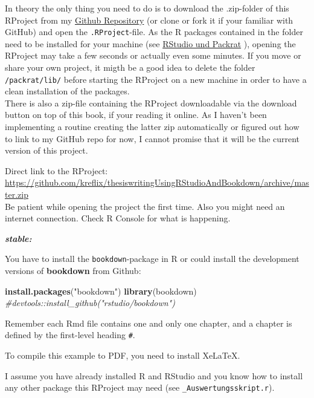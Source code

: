 \documentclass[]{book}
\makeatletter
\newenvironment{Shaded}{\begin{snugshade}}{\end{snugshade}}
\newcommand{\KeywordTok}[1]{\textcolor[rgb]{0.13,0.29,0.53}{\textbf{{#1}}}}
\newcommand{\StringTok}[1]{\textcolor[rgb]{0.31,0.60,0.02}{{#1}}}
\newcommand{\CommentTok}[1]{\textcolor[rgb]{0.56,0.35,0.01}{\textit{{#1}}}}
\newcommand{\NormalTok}[1]{{#1}}
\newenvironment{kframe}{%
\medskip{}
\setlength{\fboxsep}{.8em}
 \def\at@end@of@kframe{}%
 \ifinner\ifhmode%
  \def\at@end@of@kframe{\end{minipage}}%
  \begin{minipage}{\columnwidth}%
 \fi\fi%
 \def\FrameCommand##1{\hskip\@totalleftmargin \hskip-\fboxsep
 \colorbox{shadecolor}{##1}\hskip-\fboxsep
     \hskip-\linewidth \hskip-\@totalleftmargin \hskip\columnwidth}%
 \MakeFramed {\advance\hsize-\width
   \@totalleftmargin\z@ \linewidth\hsize
   \@setminipage}}%
 {\par\unskip\endMakeFramed%
 \at@end@of@kframe}
\renewenvironment{Shaded}{\begin{kframe}}{\end{kframe}}
\theoremstyle{definition}
\theoremstyle{definition}
\theoremstyle{remark}
\let\BeginKnitrBlock\begin \let\EndKnitrBlock\end
\makeatother
\begin{document}
In theory the only thing you need to do is to download the .zip-folder
of this RProject from my
\href{https://github.com/kreflix/thesiswritingUsingRStudioAndBookdown}{Github
Repository} (or clone or fork it if your familiar with GitHub) and open
the \texttt{.RProject}-file. As the R packages contained in the folder
need to be installed for your machine (see
\protect\hyperlink{rstudio-und-packrat}{RStudio und Packrat} ), opening
the RProject may take a few seconds or actually even some minutes. If
you move or share your own project, it migth be a good idea to delete
the folder \texttt{/packrat/lib/} before starting the RProject on a new
machine in order to have a clean installation of the packages.\\
There is also a zip-file containing the RProject downloadable via the
download button on top of this book, if your reading it online. As I
haven't been implementing a routine creating the latter zip
automatically or figured out how to link to my GitHub repo for now, I
cannot promise that it will be the current version of this project.

\BeginKnitrBlock{rmdimportant}
Direct link to the RProject:\\
\url{https://github.com/kreflix/thesiswritingUsingRStudioAndBookdown/archive/master.zip}\\
Be patient while opening the project the first time. Also you might need
an internet connection. Check R Console for what is happening.
\EndKnitrBlock{rmdimportant}

\textbf{\emph{stable:}}

You have to install the \texttt{bookdown}-package in R or could install
the development versions of \textbf{bookdown} from Github:

\begin{Shaded}
\begin{Highlighting}[]
\KeywordTok{install.packages}\NormalTok{(}\StringTok{"bookdown"}\NormalTok{)}
\KeywordTok{library}\NormalTok{(bookdown)}
\CommentTok{#devtools::install_github("rstudio/bookdown")}
\end{Highlighting}
\end{Shaded}

Remember each Rmd file contains one and only one chapter, and a chapter
is defined by the first-level heading \texttt{\#}.

To compile this example to PDF, you need to install XeLaTeX.

I assume you have already installed R and RStudio and you know how to
install any other package this RProject may need (see
\texttt{\_Auswertungsskript.r}).
\end{document}
